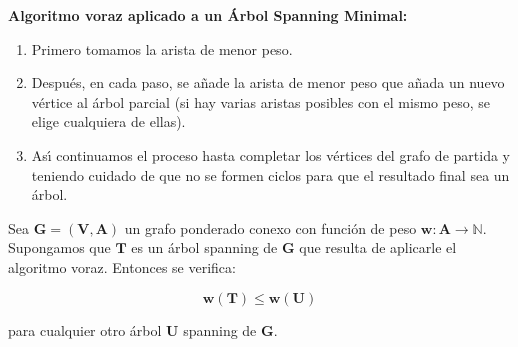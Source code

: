 \documentclass[twoside]{report}
\newcommand{\bs}[1]{\boldsymbol{#1}}
\begin{document}
\noindent\textbf{Algoritmo voraz aplicado a un \'{A}rbol Spanning Minimal:}
\vspace{0.3cm}

        \begin{enumerate}
            \item Primero tomamos la arista de menor peso.
            \item Despu\'{e}s, en cada paso, se a\~{n}ade la arista de menor peso que a\~{n}ada un nuevo v\'{e}rtice al \'{a}rbol parcial
            (si hay varias aristas posibles con el mismo peso, se elige cualquiera de ellas).
            \item As\'{\i} con\-ti\-nua\-mos el proceso hasta completar los v\'{e}rtices del grafo de partida y teniendo cuidado de que no se formen ciclos
            para que el resultado final sea un \'{a}rbol.
        \end{enumerate}

\vspace{0.2cm}

%
%

\begin{teorema}
Sea $\bs{G=(V,A)}$ un grafo ponderado conexo con funci\'{o}n de peso $\bs{w:A\rightarrow\mathbb{N}}$. Supongamos que $\bs{T}$ es un \'{a}rbol
spanning de $\bs{G}$ que resulta de aplicarle el algoritmo voraz. Entonces se verifica:

        $$\bs{w(T)\leq w(U)}$$

para cualquier otro \'{a}rbol $\bs{U}$ spanning de $\bs{G}$.
\end{teorema}
\end{document}
